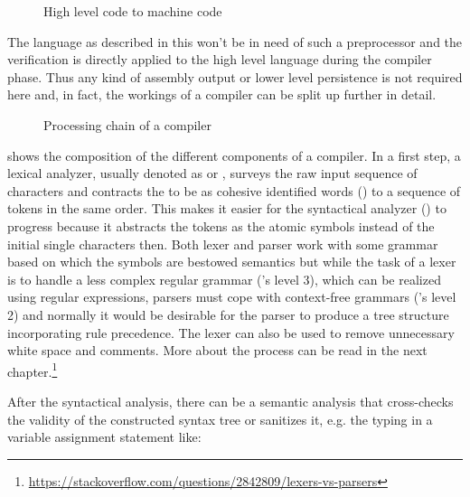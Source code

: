 \begin{figure}
	\centering

	

	\caption{High level code to machine code}
	\label{fig:HLLtoMC}
\end{figure}

The language as described in this \paper{} won't be in need of such a preprocessor and the verification is directly applied to the high level language during the compiler phase. Thus any kind of assembly output or lower level persistence is not required here and, in fact, the workings of a compiler can be split up further in detail.


\newcommand{\background}[5]{%
  }

\begin{figure}[H]
	\centering

	

	\caption{Processing chain of a compiler}
	\label{fig:compiler}
\end{figure}

 shows the composition of the different components of a compiler. In a first step, a lexical analyzer, usually denoted as  or , surveys the raw input sequence of characters and contracts the to be as cohesive identified words () to a sequence of tokens in the same order. This makes it easier for the syntactical analyzer () to progress because it abstracts the tokens as the atomic symbols instead of the initial single characters then. Both lexer and parser work with some grammar based on which the symbols are bestowed semantics but while the task of a lexer is to handle a less complex regular grammar ('s level 3), which can be realized using regular expressions, parsers must cope with context-free grammars ('s level 2) and normally it would be desirable for the parser to produce a tree structure incorporating rule precedence. The lexer can also be used to remove unnecessary white space and comments. More about the process can be read in the next chapter.\footnote{\url{https://stackoverflow.com/questions/2842809/lexers-vs-parsers}}

After the syntactical analysis, there can be a semantic analysis that cross-checks the validity of the constructed syntax tree or sanitizes it, e.g. the typing in a variable assignment statement like:

